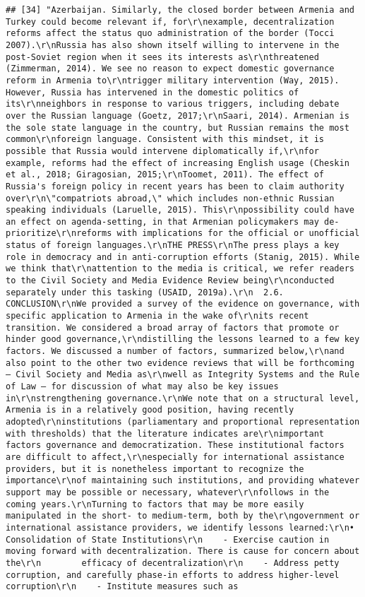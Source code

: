 \documentclass[
]{article}
\begin{document}
\begin{verbatim}
## [34] "Azerbaijan. Similarly, the closed border between Armenia and Turkey could become relevant if, for\r\nexample, decentralization reforms affect the status quo administration of the border (Tocci 2007).\r\nRussia has also shown itself willing to intervene in the post-Soviet region when it sees its interests as\r\nthreatened (Zimmerman, 2014). We see no reason to expect domestic governance reform in Armenia to\r\ntrigger military intervention (Way, 2015). However, Russia has intervened in the domestic politics of its\r\nneighbors in response to various triggers, including debate over the Russian language (Goetz, 2017;\r\nSaari, 2014). Armenian is the sole state language in the country, but Russian remains the most common\r\nforeign language. Consistent with this mindset, it is possible that Russia would intervene diplomatically if,\r\nfor example, reforms had the effect of increasing English usage (Cheskin et al., 2018; Giragosian, 2015;\r\nToomet, 2011). The effect of Russia's foreign policy in recent years has been to claim authority over\r\n\"compatriots abroad,\" which includes non-ethnic Russian speaking individuals (Laruelle, 2015). This\r\npossibility could have an effect on agenda-setting, in that Armenian policymakers may de-prioritize\r\nreforms with implications for the official or unofficial status of foreign languages.\r\nTHE PRESS\r\nThe press plays a key role in democracy and in anti-corruption efforts (Stanig, 2015). While we think that\r\nattention to the media is critical, we refer readers to the Civil Society and Media Evidence Review being\r\nconducted separately under this tasking (USAID, 2019a).\r\n  2.6.       CONCLUSION\r\nWe provided a survey of the evidence on governance, with specific application to Armenia in the wake of\r\nits recent transition. We considered a broad array of factors that promote or hinder good governance,\r\ndistilling the lessons learned to a few key factors. We discussed a number of factors, summarized below,\r\nand also point to the other two evidence reviews that will be forthcoming — Civil Society and Media as\r\nwell as Integrity Systems and the Rule of Law — for discussion of what may also be key issues in\r\nstrengthening governance.\r\nWe note that on a structural level, Armenia is in a relatively good position, having recently adopted\r\ninstitutions (parliamentary and proportional representation with thresholds) that the literature indicates are\r\nimportant factors governance and democratization. These institutional factors are difficult to affect,\r\nespecially for international assistance providers, but it is nonetheless important to recognize the importance\r\nof maintaining such institutions, and providing whatever support may be possible or necessary, whatever\r\nfollows in the coming years.\r\nTurning to factors that may be more easily manipulated in the short- to medium-term, both by the\r\ngovernment or international assistance providers, we identify lessons learned:\r\n• Consolidation of State Institutions\r\n    - Exercise caution in moving forward with decentralization. There is cause for concern about the\r\n        efficacy of decentralization\r\n    - Address petty corruption, and carefully phase-in efforts to address higher-level corruption\r\n    - Institute measures such as 
\end{verbatim}
\end{document}
